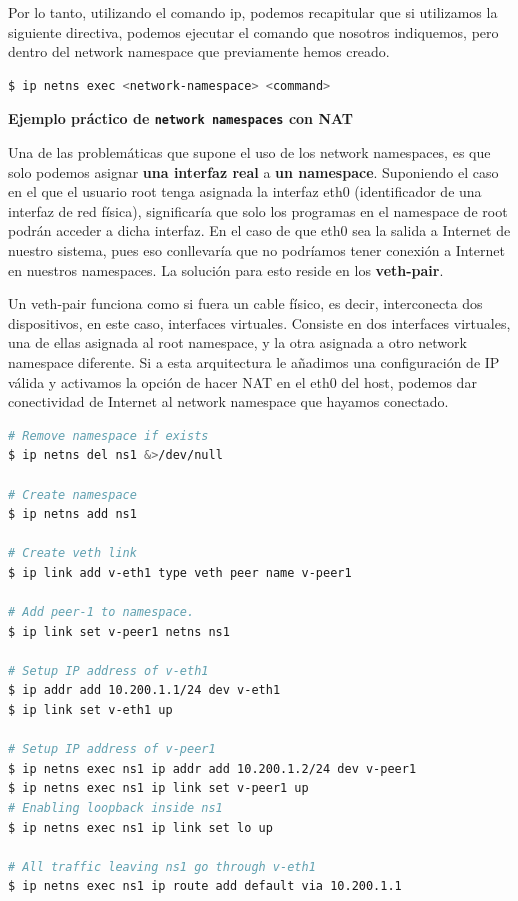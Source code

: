 \documentclass[12pt]{article}
\begin{document}
	\par \noindent Por lo tanto, utilizando el comando ip, podemos recapitular que si utilizamos la siguiente directiva, podemos ejecutar el comando que nosotros indiquemos, pero dentro del network namespace que previamente hemos creado.
	\begin{lstlisting}[language=bash, caption=Ejecutar cualquier programa con un network namespace]
$ ip netns exec <network-namespace> <command>
	\end{lstlisting}

	\pagebreak
	
	\noindent \textbf{\large Ejemplo práctico de \texttt{network namespaces} con NAT}\\
	\par \noindent Una de las problemáticas que supone el uso de los network namespaces, es que solo podemos asignar \textbf{una interfaz real} a \textbf{un namespace}. Suponiendo el caso en el que el usuario root tenga asignada la interfaz eth0 (identificador de una interfaz de red física), significaría que solo los programas en el namespace de root podrán acceder a dicha interfaz. En el caso de que eth0 sea la salida a Internet de nuestro sistema, pues eso conllevaría que no podríamos tener conexión a Internet en nuestros namespaces. La solución para esto reside en los \textbf{veth-pair}.
	
	\addvspace{10px}
	
	\par \noindent Un veth-pair funciona como si fuera un cable físico, es decir, interconecta dos dispositivos, en este caso, interfaces virtuales. Consiste en dos interfaces virtuales, una de ellas asignada al root namespace, y la otra asignada a otro network namespace diferente. Si a esta arquitectura le añadimos una configuración de IP válida y activamos la opción de hacer NAT en el eth0 del host, podemos dar conectividad de Internet al network namespace que hayamos conectado.
	
	\addvspace{10px}
	
	\begin{lstlisting}[language=bash, caption=Ejemplo configuración de NAT entre eth0 y veth]
# Remove namespace if exists
$ ip netns del ns1 &>/dev/null

# Create namespace
$ ip netns add ns1

# Create veth link
$ ip link add v-eth1 type veth peer name v-peer1

# Add peer-1 to namespace.
$ ip link set v-peer1 netns ns1

# Setup IP address of v-eth1
$ ip addr add 10.200.1.1/24 dev v-eth1
$ ip link set v-eth1 up

# Setup IP address of v-peer1
$ ip netns exec ns1 ip addr add 10.200.1.2/24 dev v-peer1
$ ip netns exec ns1 ip link set v-peer1 up
# Enabling loopback inside ns1
$ ip netns exec ns1 ip link set lo up

# All traffic leaving ns1 go through v-eth1
$ ip netns exec ns1 ip route add default via 10.200.1.1
	\end{lstlisting}
\end{document}
